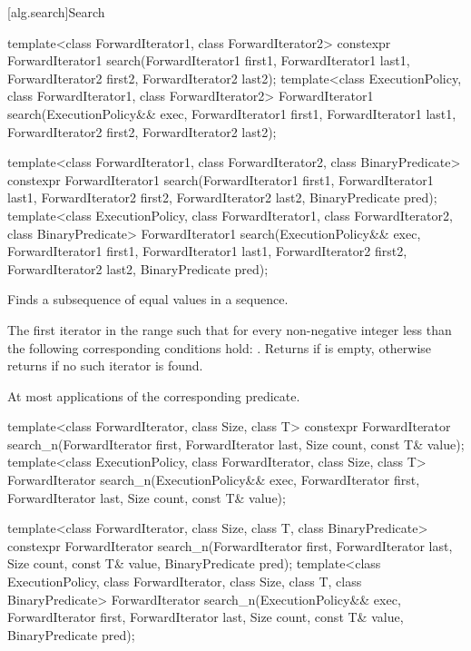 [alg.search]{Search}

%
\begin{itemdecl}
template<class ForwardIterator1, class ForwardIterator2>
  constexpr ForwardIterator1
    search(ForwardIterator1 first1, ForwardIterator1 last1,
           ForwardIterator2 first2, ForwardIterator2 last2);
template<class ExecutionPolicy, class ForwardIterator1, class ForwardIterator2>
  ForwardIterator1
    search(ExecutionPolicy&& exec,
           ForwardIterator1 first1, ForwardIterator1 last1,
           ForwardIterator2 first2, ForwardIterator2 last2);

template<class ForwardIterator1, class ForwardIterator2,
         class BinaryPredicate>
  constexpr ForwardIterator1
    search(ForwardIterator1 first1, ForwardIterator1 last1,
           ForwardIterator2 first2, ForwardIterator2 last2,
           BinaryPredicate pred);
template<class ExecutionPolicy, class ForwardIterator1, class ForwardIterator2,
         class BinaryPredicate>
  ForwardIterator1
    search(ExecutionPolicy&& exec,
           ForwardIterator1 first1, ForwardIterator1 last1,
           ForwardIterator2 first2, ForwardIterator2 last2,
           BinaryPredicate pred);
\end{itemdecl}

\begin{itemdescr}
\pnum
\effects
Finds a subsequence of equal values in a sequence.

\pnum
\returns
The first iterator
in the range 
such that for every non-negative integer
less than
the following corresponding conditions hold:
.
Returns 
if  is empty,
otherwise returns 
if no such iterator is found.

\pnum
\complexity
At most
applications of the corresponding predicate.
\end{itemdescr}

%
\begin{itemdecl}
template<class ForwardIterator, class Size, class T>
  constexpr ForwardIterator
    search_n(ForwardIterator first, ForwardIterator last,
             Size count, const T& value);
template<class ExecutionPolicy, class ForwardIterator, class Size, class T>
  ForwardIterator
    search_n(ExecutionPolicy&& exec,
             ForwardIterator first, ForwardIterator last,
             Size count, const T& value);

template<class ForwardIterator, class Size, class T,
         class BinaryPredicate>
  constexpr ForwardIterator
    search_n(ForwardIterator first, ForwardIterator last,
             Size count, const T& value,
             BinaryPredicate pred);
template<class ExecutionPolicy, class ForwardIterator, class Size, class T,
         class BinaryPredicate>
  ForwardIterator
    search_n(ExecutionPolicy&& exec,
             ForwardIterator first, ForwardIterator last,
             Size count, const T& value,
             BinaryPredicate pred);
\end{itemdecl}

